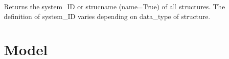 \documentclass[letterpaper,10pt,english]{sphinxmanual}
\begin{document}
\begin{fulllineitems}
\begin{fulllineitems}
\end{fulllineitems}


\begin{fulllineitems}
\label{classes:catdata.CATData.get_structures}
Returns the system\_ID or strucname (name=True) of all structures.
The definition of system\_ID varies depending on data\_type of structure.

\end{fulllineitems}


\end{fulllineitems}



\section{Model}
\label{classes:model}\label{classes:module-catparam}
\end{document}
